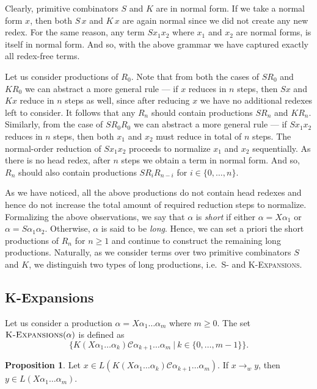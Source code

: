 \documentclass[11pt,a4paper]{amsart}
\theoremstyle{definition}
\newtheorem{prop}[theorem]{Proposition}
\newcommand{\KExpansions}[1]{\textsc{K-Expansions}(#1)}
\begin{document}
 Clearly, primitive combinators $S$ and $K$ are in normal form. If we take a normal form $x$, then both $S\, x$ and $K\, x$ are again normal since we did not create any new redex. For the same reason, any term $S x_1 x_2$ where $x_1$ and $x_2$ are normal forms, is itself in normal form. And so, with the above grammar we have captured exactly all redex-free terms.

Let us consider productions of $R_0$. Note that from both the cases of $S R_0$ and $K R_0$ we can abstract a more general rule --- if $x$ reduces in $n$ steps, then $S x$ and $K x$ reduce in $n$ steps as well, since after reducing $x$ we have no additional redexes left to consider. It follows that any $R_n$ should contain productions $S R_n$ and $K R_n$. Similarly, from the case of $S R_0 R_0$ we can abstract a more general rule --- if $S x_1 x_2$ reduces in $n$ steps, then both $x_1$ and $x_2$ must reduce in total of $n$ steps. The normal-order reduction of $S x_1 x_2$ proceeds to normalize $x_1$ and $x_2$ sequentially. As there is no head redex, after $n$ steps we obtain a term in normal form. And so, $R_n$ should also contain productions $S R_i R_{n-i}$ for $i \in \{0,\ldots,n\}$.
 
 As we have noticed, all the above productions do not contain head redexes and hence do not increase the total amount of required reduction steps to normalize. Formalizing the above observations, we say that $\alpha$ is \emph{short} if either $\alpha = X \alpha_1$ or $\alpha = S \alpha_1 \alpha_2$. Otherwise, $\alpha$ is said to be \emph{long}. Hence, we can set a priori the short productions of $R_n$ for $n \geq 1$ and continue to construct the remaining long productions. Naturally, as we consider terms over two primitive combinators $S$ and $K$, we distinguish two types of long productions, i.e.~\textsc{S-} and \textsc{K-Expansions}.
 
 \subsection{K-Expansions}\label{sec:k-expansions}
Let us consider a production $\alpha = X \alpha_1 \ldots \alpha_m$ where $m \geq 0$. The set $\KExpansions{\alpha}$ is defined as
\[ \Big\{ K (X \alpha_1 \ldots \alpha_k) \mathcal{C} \alpha_{k+1} \ldots \alpha_m~|~k \in \{0,\ldots,m-1\} \Big\}. \]

\begin{prop}\label{prop-K}
        Let $x \in L(K (X \alpha_1 \ldots \alpha_k) \mathcal{C} \alpha_{k+1}
        \ldots \alpha_m)$. If $x \to_w y$, then $y \in L(X \alpha_1 \ldots
        \alpha_m)$.
\end{prop}
\end{document}
